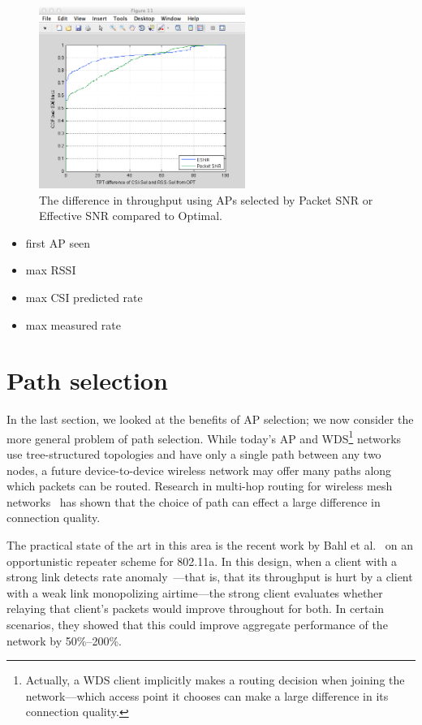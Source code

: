 \begin{figure}[htp]
	\centering
	\includegraphics[width=0.6\textwidth]{figures/esnr/ap_sel_delta_opt.png}
	\caption{\label{fig:ap_sel_delta_opt}The difference in throughput using APs selected by Packet SNR or Effective SNR compared to Optimal.}
\end{figure}
\begin{itemize}
\item first AP seen
\item max RSSI
\item max CSI predicted rate
\item max measured rate
\end{itemize}

\section{Path selection}\label{sec:esnr_pathsel}
In the last section, we looked at the benefits of AP selection; we now consider the more general problem of path selection. While today's AP and WDS\footnote{Actually, a WDS client implicitly makes a routing decision when joining the network---which access point it chooses can make a large difference in its connection quality.} networks use tree-structured topologies and have only a single path between any two nodes, a future device-to-device wireless network may offer many paths along which packets can be routed. Research in multi-hop routing for wireless mesh networks~\cite{Bahl_repeater,Rodrig_thesis} has shown that the choice of path can effect a large difference in connection quality.

The practical state of the art in this area is the recent work by Bahl et al.~\cite{Bahl_repeater} on an opportunistic repeater scheme for 802.11a. In this design, when a client with a strong link detects rate anomaly~\cite{Heusse_RateAnomaly}---that is, that its throughput is hurt by a client with a weak link monopolizing airtime---the strong client evaluates whether relaying that client's packets would improve throughout for both. In certain scenarios, they showed that this could improve aggregate performance of the network by 50\%--200\%.


